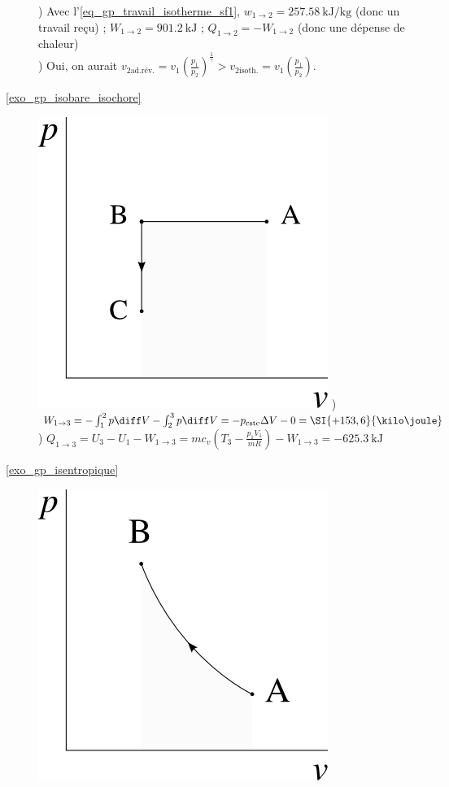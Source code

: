 \begin{description}
					) Avec l’\cref{eq_gp_travail_isotherme_sf1}, $w_{1 \to 2} = \SI{+257,58}{\kilo\joule\per\kilogram}$ (donc un travail reçu) ; $W_{1 \to 2} = \SI{+901,2}{\kilo\joule}$ ; $Q_{1 \to 2} = - W_{1 \to 2}$ (donc une dépense de chaleur)\\
				 	) Oui, on aurait $v_{2 \text{ad.rév.}} = v_1 \left(\frac{p_1}{p_2}\right)^{\frac{1}{\gamma}} > v_{2 \text{isoth.}} =  v_1 \left(\frac{p_1}{p_2}\right)$.
	\item [\ref{exo_gp_isobare_isochore}]
					\includegraphics[width=\solutiondiagramwidth]{images/exo_sol_pv_isob_isoch.png}
					) $W_{1 \to 3} = -\int_1^2 p \diff V - \int_2^3 p \diff V = -p_\text{cste} \Delta V - 0 = \SI{+153,6}{\kilo\joule}$	
					) $Q_{1 \to 3} = U_3 - U_1 - W_{1 \to 3} = m c_v \left(T_3 - \frac{p_1 V_1}{m R}\right) - W_{1 \to 3} = \SI{-625,3}{\kilo\joule}$
	\item [\ref{exo_gp_isentropique}]
					\includegraphics[width=\solutiondiagramwidth]{images/exo_sol_pv_isentr.png}

\end{description}
